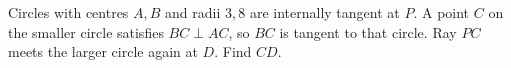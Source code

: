 Circles with centres $A,B$ and radii $3,8$ are internally tangent at $P$. A point $C$ on the smaller circle satisfies $BC\perp AC$, so $BC$ is tangent to that circle. Ray $PC$ meets the larger circle again at $D$. Find $CD$.
